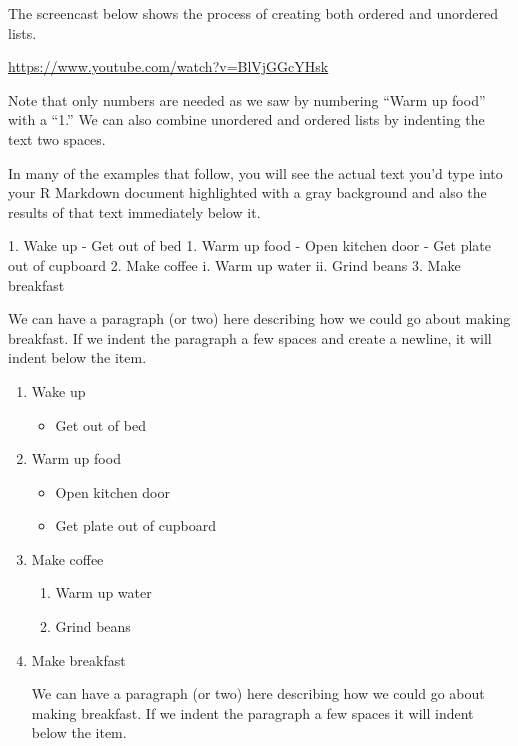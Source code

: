 \documentclass[]{tufte-book}
\newenvironment{Shaded}{\begin{snugshade}}{\end{snugshade}}
\newcommand{\NormalTok}[1]{#1}
\newcommand{\SpecialStringTok}[1]{\textcolor[rgb]{0.31,0.60,0.02}{#1}}
\providecommand{\tightlist}{%
  \setlength{\itemsep}{0pt}\setlength{\parskip}{0pt}}
\begin{document}
The screencast below shows the process of creating both ordered and unordered lists.

\vspace{0.1in}\begin{center}\footnotesize{\url{https://www.youtube.com/watch?v=BlVjGGcYHsk}}\end{center}\vspace{0.1in}

Note that only numbers are needed as we saw by numbering ``Warm up food'' with a ``1.'' We can also combine unordered and ordered lists by indenting the text two spaces.

In many of the examples that follow, you will see the actual text you'd type into your R Markdown document highlighted with a gray background and also the results of that text immediately below it.

\begin{Shaded}
\begin{Highlighting}[]
\SpecialStringTok{1. }\NormalTok{Wake up}
\SpecialStringTok{  {-} }\NormalTok{Get out of bed}
\SpecialStringTok{1. }\NormalTok{Warm up food}
\SpecialStringTok{  {-} }\NormalTok{Open kitchen door}
\SpecialStringTok{  {-} }\NormalTok{Get plate out of cupboard}
\SpecialStringTok{2. }\NormalTok{Make coffee}
\NormalTok{  i. Warm up water}
\NormalTok{  ii. Grind beans}
\SpecialStringTok{3. }\NormalTok{Make breakfast}

\NormalTok{  We can have a paragraph (or two) here describing how we could go about making}
\NormalTok{  breakfast. If we indent the paragraph a few spaces and create a newline, it}
\NormalTok{  will indent below the item.}
\end{Highlighting}
\end{Shaded}

\begin{enumerate}
\def\labelenumi{\arabic{enumi}.}
\item
  Wake up

  \begin{itemize}
  \tightlist
  \item
    Get out of bed
  \end{itemize}
\item
  Warm up food

  \begin{itemize}
  \tightlist
  \item
    Open kitchen door
  \item
    Get plate out of cupboard
  \end{itemize}
\item
  Make coffee

  \begin{enumerate}
  \def\labelenumii{\roman{enumii}.}
  \tightlist
  \item
    Warm up water
  \item
    Grind beans
  \end{enumerate}
\item
  Make breakfast

  We can have a paragraph (or two) here describing how we could go about making breakfast. If we indent the paragraph a few spaces it will indent below the item.
\end{enumerate}
\end{document}
